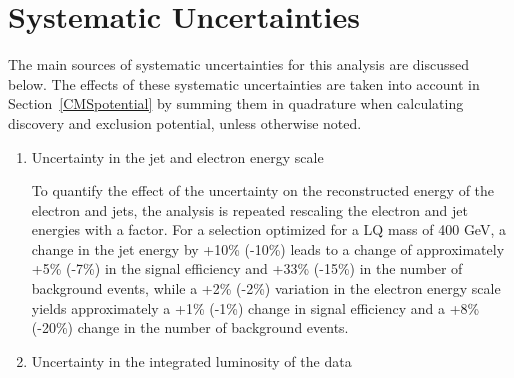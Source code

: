 %

\section{Systematic Uncertainties} \label{sec:Systematics}

The main sources of systematic uncertainties for this analysis are discussed below.
The effects of these systematic uncertainties are taken into account in Section~\ref{CMSpotential} 
by summing them in quadrature when calculating discovery and exclusion potential, unless otherwise noted.
%
\begin{enumerate}
\item Uncertainty in the jet and electron energy scale

To quantify the effect of the uncertainty on the reconstructed energy of the electron and jets,
the analysis is repeated rescaling the electron and jet energies
 with a factor. 
For a selection optimized for a LQ mass of 400 GeV, a change in the jet energy by +10\% (-10\%) leads 
to a change of approximately +5\% (-7\%) in the signal efficiency and +33\% (-15\%) in the number of background events, 
while a +2\% (-2\%) variation in the electron energy scale yields approximately a +1\% (-1\%) 
change in signal efficiency and a +8\% (-20\%) change in the number of background events. 


\item Uncertainty in the integrated luminosity of the data


\end{enumerate}
